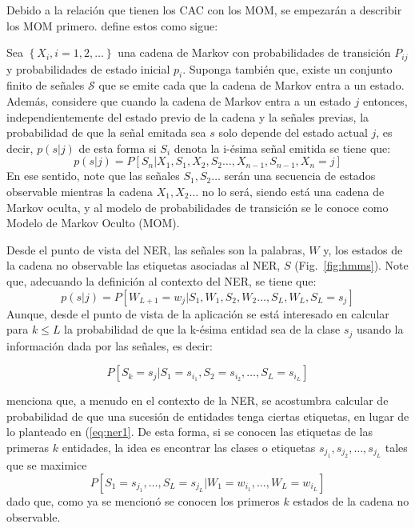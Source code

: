Debido a la relación que tienen los CAC con los MOM, se empezarán a describir los MOM primero. \cite{ross2014introduction} define estos como sigue:

\begin{defi}
	Sea $\left\lbrace X_i, i=1,2,\ldots\right\rbrace$ una cadena de Markov con probabilidades de transición $P_{ij}$ y probabilidades de estado inicial $p_i$. Suponga también que, existe un conjunto finito de señales $\mathcal{S}$ que se emite cada que la cadena de Markov entra a un estado. Además, considere que cuando la cadena de Markov entra a un estado $j$ entonces, independientemente del estado previo de la cadena y la señales previas, la probabilidad de que la señal emitada sea $s$ solo depende del estado actual $j$, es decir, $p(s|j)$ de esta forma si $S_i$ denota la i-ésima señal emitida se tiene que:
	$$p(s|j) = P\left[S_n \vert X_1,S_1,X_2,S_2\ldots,X_{n-1},S_{n-1},X_{n}=j\right]$$
	En ese sentido, note que las señales $S_1,S_2\ldots$ serán una secuencia de estados observable mientras la cadena $X_1,X_2\ldots$ no lo será, siendo está una cadena de Markov oculta, y al modelo de probabilidades de transición se le conoce como Modelo de Markov Oculto (MOM).
\end{defi}

Desde el punto de vista del NER, las señales son la palabras, $W$ y, los estados de la cadena no observable las etiquetas asociadas al NER, $S$ (Fig.~\ref{fig:hmms}). Note que, adecuando la definición al contexto del NER, se tiene que:
$$p(s|j) = P\left[W_{L+1} = w_j | S_1,W_1,S_2,W_2\ldots,S_{L},W_{L},S_{L}=s_j\right]$$ Aunque, desde el punto de vista de la aplicación se está interesado en calcular para $k\leq L$ la probabilidad de que la k-ésima entidad sea de la clase $s_j$ usando la información dada por las señales, es decir:

\begin{equation}
	\label{eq:ner1}
	P\left[S_{k} = s_j | S_1=s_{i_1},S_2=s_{i_2},\ldots,S_L=s_{i_L}\right]
\end{equation}

\cite{nouvel2016named} menciona que, a menudo en el contexto de la NER, se acostumbra calcular de probabilidad de que una sucesión de entidades tenga ciertas etiquetas, en lugar de lo planteado en (\ref{eq:ner1}. De esta forma, si se conocen las etiquetas de las primeras $k$ entidades, la idea es encontrar las clases o etiquetas $s_{j_1},s_{j_2},\ldots,s_{j_L}$ tales que se maximice 
\begin{equation}
	\label{eq:hmmsolve}
	P\left[S_{1} = s_{j_1}, \ldots, S_{L} = s_{j_L} | W_1=w_{i_1},\ldots,W_L=w_{i_L}\right]
\end{equation}
dado que, como ya se mencionó se conocen los primeros $k$ estados de la cadena no observable.

